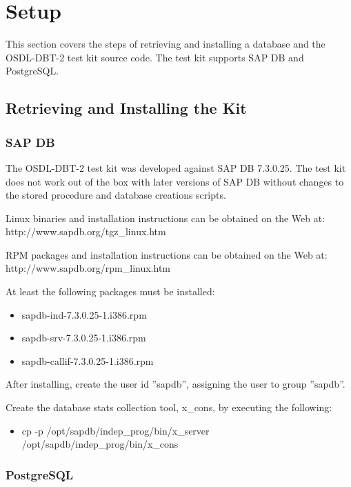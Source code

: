 \documentclass{article}
\begin{document}
\section{Setup}

This section covers the steps of retrieving and installing a database and the
OSDL-DBT-2 test kit source code.  The test kit supports SAP DB and PostgreSQL.

\subsection{Retrieving and Installing the Kit}

\subsubsection{SAP DB}

The OSDL-DBT-2 test kit was developed against SAP DB 7.3.0.25.  The test kit
does not work out of the box with later versions of SAP DB without changes
to the stored procedure and database creations scripts.

\noindent
Linux binaries and installation instructions can be obtained on the Web at:
http://www.sapdb.org/tgz\_linux.htm

\noindent
RPM packages and installation instructions can be obtained on the Web at:
http://www.sapdb.org/rpm\_linux.htm

\noindent
At least the following packages must be installed:
\begin{itemize}
\item sapdb-ind-7.3.0.25-1.i386.rpm
\item sapdb-srv-7.3.0.25-1.i386.rpm
\item sapdb-callif-7.3.0.25-1.i386.rpm
\end{itemize}

\noindent
After installing, create the user id ''sapdb'', assigning the user to group
''sapdb''.

\noindent
Create the database stats collection tool, x\_cons, by executing the
following:
\begin{itemize}
\item cp -p /opt/sapdb/indep\_prog/bin/x\_server
      /opt/sapdb/indep\_prog/bin/x\_cons
\end{itemize}

\subsubsection{PostgreSQL}
\end{document}
